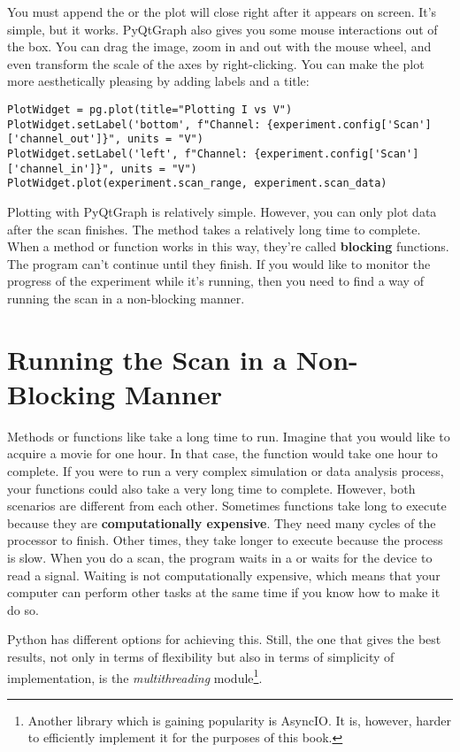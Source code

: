 You must append the  or the plot will close right after it appears on screen. It's simple, but it works. PyQtGraph also gives you some mouse interactions out of the box. You can drag the image, zoom in and out with the mouse wheel, and even transform the scale of the axes by right-clicking. You can make the plot more aesthetically pleasing by adding labels and a title:

\begin{verbatim}
PlotWidget = pg.plot(title="Plotting I vs V")
PlotWidget.setLabel('bottom', f"Channel: {experiment.config['Scan']['channel_out']}", units = "V")
PlotWidget.setLabel('left', f"Channel: {experiment.config['Scan']['channel_in']}", units = "V")
PlotWidget.plot(experiment.scan_range, experiment.scan_data)
\end{verbatim}

Plotting with PyQtGraph is relatively simple. However, you can only plot data after the scan finishes. The  method takes a relatively long time to complete. When a method or function works in this way, they're called \textbf{blocking} functions. The program can't continue until they finish. If you would like to monitor the progress of the experiment while it's running, then you need to find a way of running the scan in a non-blocking manner.

\section{Running the Scan in a Non-Blocking Manner}\label{sec:nonblocking}
Methods or functions like  take a long time to run. Imagine that you would like to acquire a movie for one hour. In that case, the function would take one hour to complete. If you were to run a very complex simulation or data analysis process, your functions could also take a very long time to complete. However, both scenarios are different from each other. Sometimes functions take long to execute because they are \textbf{computationally expensive}. They need many cycles of the processor to finish. Other times, they take longer to execute because the process is slow. When you do a scan, the program waits in a  or waits for the device to read a signal. Waiting is not computationally expensive, which means that your computer can perform other tasks at the same time if you know how to make it do so.

Python has different options for achieving this. Still, the one that gives the best results, not only in terms of flexibility but also in terms of simplicity of implementation, is the \emph{multithreading} module\footnote{Another library which is gaining popularity is AsyncIO. It is, however, harder to efficiently implement it for the purposes of this book.}.

